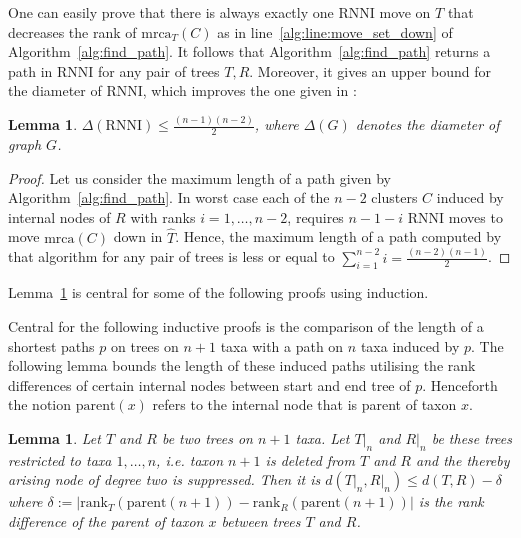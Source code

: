 \documentclass{amsart}
\newcommand{\parent}{\mathrm{parent}}
\newcommand{\mrca}{\mathrm{mrca}}
\newcommand{\rank}{\mathrm{rank}}
\newcommand{\rnni}{\mathrm{RNNI}}
\newtheorem{lemma}[definition]{Lemma}
\begin{document}
One can easily prove that there is always exactly one $\rnni$ move on $T$ that decreases the rank of $\mrca_T(C)$ as in line~\ref{alg:line:move_set_down} of Algorithm~\ref{alg:find_path}.
It follows that Algorithm~\ref{alg:find_path} returns a path in $\rnni$ for any pair of trees $T,R$.
Moreover, it gives an upper bound for the diameter of $\rnni$, which improves the one given in \autocite{Gavryushkin2017}:

\begin{lemma}
    $\Delta(\rnni) \leq \frac{(n-1)(n-2)}{2}$, where $\Delta(G)$ denotes the diameter of graph $G$.
\end{lemma}

\begin{proof}
    Let us consider the maximum length of a path given by Algorithm~\ref{alg:find_path}.
    In worst case each of the $n-2$ clusters $C$ induced by internal nodes of $R$ with ranks $i = 1, \dots, n-2$, requires $n-1-i$ $\rnni$ moves to move $\mrca(C)$ down in $\hat{T}$.
	Hence, the maximum length of a path computed by that algorithm for any pair of trees is less or equal to $\sum\limits_{i = 1}^{n-2} i = \frac{(n-2)(n-1)}{2}$.
\end{proof}

Lemma~\ref{lemma:distance_delete_taxon} is central for some of the following proofs using induction.

Central for the following inductive proofs is the comparison of the length of a shortest paths $p$ on trees on $n+1$ taxa with a path on $n$ taxa induced by $p$.
The following lemma bounds the length of these induced paths utilising the rank differences of certain internal nodes between start and end tree of $p$.
Henceforth the notion $\parent(x)$ refers to the internal node that is parent of taxon $x$.

\begin{lemma}
    Let $T$ and $R$ be two trees on $n+1$ taxa.
    Let $T{\big|}_n$ and $R{\big|}_n$ be these trees restricted to taxa $1, \ldots, n$, i.e. taxon $n+1$ is deleted from $T$ and $R$ and the thereby arising node of degree two is suppressed.
    Then it is $d(T{\big|}_n, R{\big|}_n) \leq d(T,R) - \delta$ where $\delta:= |\rank_T(\parent(n+1)) - \rank_R(\parent(n+1))|$ is the rank difference of the parent of taxon $x$ between trees $T$ and $R$.
    \label{lemma:distance_delete_taxon}
\end{lemma}
\end{document}
